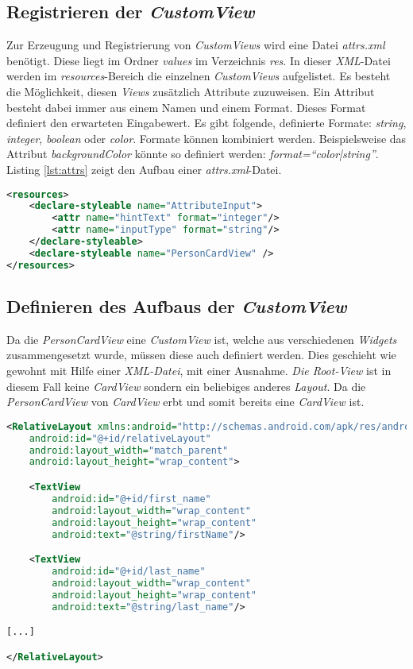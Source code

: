 \subsection{Registrieren der \textit{CustomView}}
Zur Erzeugung und Registrierung von \textit{CustomViews} wird eine Datei \textit{attrs.xml} benötigt. Diese liegt im Ordner \textit{values} im Verzeichnis \textit{res}. 
In dieser \textit{XML}-Datei werden im \textit{resources}-Bereich die einzelnen \textit{CustomViews} aufgelistet. Es besteht die Möglichkeit, diesen \textit{Views} zusätzlich Attribute zuzuweisen. Ein Attribut besteht dabei immer aus einem Namen und einem Format. Dieses Format definiert den erwarteten Eingabewert. Es gibt folgende, definierte Formate: \textit{string}, \textit{integer}, \textit{boolean} oder \textit{color}. 
Formate können kombiniert werden. Beispielsweise das Attribut \textit{backgroundColor} könnte so definiert werden: \textit{format=\enquote{color|string}}. Listing \ref{lst:attrs} zeigt den Aufbau einer \textit{attrs.xml}-Datei.

\begin{lstlisting}[label=lst:attrs,
language=xml,
firstnumber=1,
caption=Aufbau einer \textit{attrs.xml} - Datei.]				  
<resources>
	<declare-styleable name="AttributeInput">
		<attr name="hintText" format="integer"/>
		<attr name="inputType" format="string"/>
	</declare-styleable>
	<declare-styleable name="PersonCardView" />
</resources>
\end{lstlisting}

\subsection{Definieren des Aufbaus der \textit{CustomView}}

Da die \textit{PersonCardView} eine \textit{CustomView} ist, welche aus verschiedenen \textit{Widgets} zusammengesetzt wurde, müssen diese auch definiert werden. Dies geschieht wie gewohnt mit Hilfe einer \textit{XML-Datei}, mit einer Ausnahme. \textit{Die Root-View} ist in diesem Fall keine \textit{CardView} sondern ein beliebiges anderes \textit{Layout}. Da die \textit{PersonCardView} von \textit{CardView} erbt und somit bereits eine \textit{CardView} ist.

\begin{lstlisting}[label=lst:personCardViewXml,
language=xml,
firstnumber=1,
caption=Aufbau der \textit{PersonCardView} mit Hilfe einer \textit{XML}-Datei]				  
<RelativeLayout xmlns:android="http://schemas.android.com/apk/res/android"
	android:id="@+id/relativeLayout"
	android:layout_width="match_parent"
	android:layout_height="wrap_content">

	<TextView
		android:id="@+id/first_name"
		android:layout_width="wrap_content"
		android:layout_height="wrap_content"
		android:text="@string/firstName"/>

	<TextView
		android:id="@+id/last_name"
		android:layout_width="wrap_content"
		android:layout_height="wrap_content"
		android:text="@string/last_name"/>

[...]

</RelativeLayout>
\end{lstlisting}

